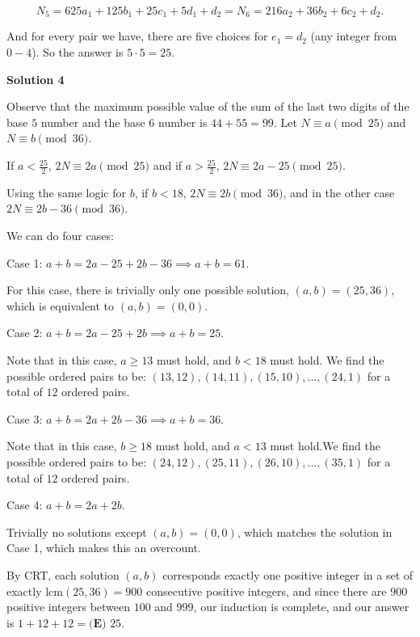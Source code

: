 \begin{enumerate}
 
 \[N_5 =  625a_1 + 125b_1 + 25c_1 + 5d_1 + d_2 = N_6 =  216a_2 + 36b_2 + 6c_2 + d_2.\] 

 And for every pair we have, there are five choices for $e_1 = d_2$ (any integer from $0 - 4$). So the answer is $5 \cdot 5 = \boxed{25}.$




\textbf{Solution 4}

Observe that the maximum possible value of the sum of the last two digits of the base $5$ number and the base $6$ number is $44+55=99$. Let $N \equiv a \pmod {25}$ and $N \equiv b \pmod {36}$. 

 If $a < \frac{25}{2}$, $2N \equiv 2a \pmod {25}$ and if $a > \frac{25}{2}$, $2N \equiv 2a - 25 \pmod {25}$.

 Using the same logic for $b$, if $b < 18$, $2N \equiv 2b \pmod {36}$, and in the other case $2N \equiv 2b - 36 \pmod {36}$.

 We can do four cases:

 Case 1: $a + b = 2a - 25 + 2b - 36 \implies a + b = 61$.

 For this case, there is trivially only one possible solution, $(a, b) = (25, 36)$, which is equivalent to $(a, b) = (0, 0)$. 

 Case 2: $a + b = 2a - 25 + 2b \implies a + b = 25$.

 Note that in this case, $a \geq 13$ must hold, and $b < 18$ must hold. We find the possible ordered pairs to be: $(13, 12), (14, 11), (15, 10), ..., (24, 1)$ for a total of $12$ ordered pairs.

 Case 3: $a + b = 2a + 2b - 36 \implies a + b = 36$.

 Note that in this case, $b \geq 18$ must hold, and $a < 13$ must hold.We find the possible ordered pairs to be: $(24, 12), (25, 11), (26, 10), ..., (35, 1)$ for a total of $12$ ordered pairs.

 Case 4: $a + b = 2a + 2b$.

 Trivially no solutions except $(a, b) = (0, 0)$, which matches the solution in Case 1, which makes this an overcount.

 By CRT, each solution $(a, b)$ corresponds exactly one positive integer in a set of exactly $\text{lcm} (25, 36) = 900$ consecutive positive integers, and since there are $900$ positive integers between $100$ and $999$, our induction is complete, and our answer is $1 + 12 + 12 = \boxed{\textbf{(E) }25}$.

 


 


\end{enumerate}